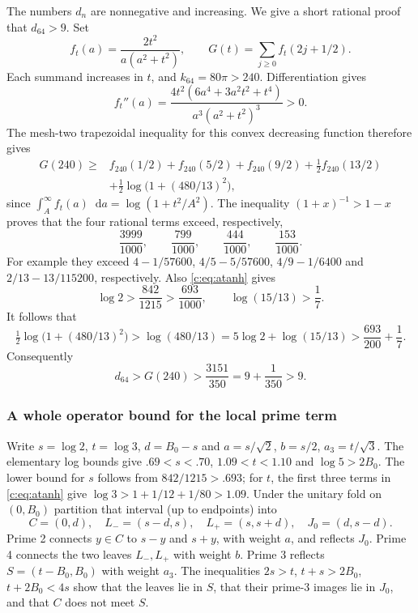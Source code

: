 \documentclass[11pt,a4paper]{article}
\numberwithin{equation}{section}
\theoremstyle{definition}\newtheorem{definition}[theorem]{Definition}
\theoremstyle{remark}\newtheorem{remark}[theorem]{Remark}
\newcommand{\dd}{\mathop{}\!\mathrm d}\newcommand{\one}{\mathbf1}
\begin{document}
The numbers $d_n$ are nonnegative and increasing. We give a short
rational proof that $d_{64}>9$. Set
\[
 f_t(a)=\frac{2t^2}{a(a^2+t^2)},\qquad G(t)=\sum_{j\ge0}f_t(2j+1/2).
\]
Each summand increases in $t$, and $k_{64}=80\pi>240$.
Differentiation gives
\[
 f_t''(a)=\frac{4t^2(6a^4+3a^2t^2+t^4)}{a^3(a^2+t^2)^3}>0.
\]
The mesh-two trapezoidal inequality for this convex decreasing function
therefore gives
\begin{align*}
 G(240)\ge{}&f_{240}(1/2)+f_{240}(5/2)+f_{240}(9/2)
 +\tfrac12f_{240}(13/2)\\
 &+\tfrac12\log\bigl(1+(480/13)^2\bigr),
\end{align*}
since $\int_A^\infty f_t(a)\dd a=\log(1+t^2/A^2)$.
The inequality $(1+x)^{-1}>1-x$ proves that the four rational terms
exceed, respectively,
\[
 \frac{3999}{1000},\qquad\frac{799}{1000},\qquad
 \frac{444}{1000},\qquad\frac{153}{1000}.
\]
For example they exceed $4-1/57600$, $4/5-5/57600$,
$4/9-1/6400$ and $2/13-13/115200$, respectively.
Also \eqref{c:eq:atanh} gives
\[
 \log2>\frac{842}{1215}>\frac{693}{1000},\qquad
 \log(15/13)>\frac17.
\]
It follows that
\[
 \tfrac12\log\bigl(1+(480/13)^2\bigr)
 >\log(480/13)=5\log2+\log(15/13)
 >\frac{693}{200}+\frac17.
\]
Consequently
\begin{equation}\label{c:eq:d64}
 d_{64}>G(240)>\frac{3151}{350}=9+\frac1{350}>9.
\end{equation}

\subsubsection{A whole operator bound for the local prime term}
Write $s=\log2$, $t=\log3$, $d={B_0}-s$ and
$a=s/\sqrt2$, $b=s/2$, $a_3=t/\sqrt3$.
The elementary log bounds give $.69<s<.70$, $1.09<t<1.10$ and
$\log5>2{B_0}$. The lower bound for $s$ follows from $842/1215>.693$;
for $t$, the first three terms in \eqref{c:eq:atanh} give
$\log3>1+1/12+1/80>1.09$.
Under the unitary fold on $(0,{B_0})$ partition that interval
(up to endpoints) into
\[
 C=(0,d),\quad L_-=(s-d,s),\quad L_+=(s,s+d),\quad
 J_0=(d,s-d).
\]
Prime 2 connects $y\in C$ to $s-y$ and $s+y$, with weight $a$,
and reflects $J_0$. Prime 4 connects the two leaves $L_-,L_+$
with weight $b$. Prime 3 reflects $S=(t-{B_0},{B_0})$ with weight $a_3$.
The inequalities
$2s>t$, $t+s>2{B_0}$, $t+2{B_0}<4s$ show that the leaves lie in $S$,
that their prime-3 images lie in $J_0$, and that $C$ does not meet $S$.
\end{document}
